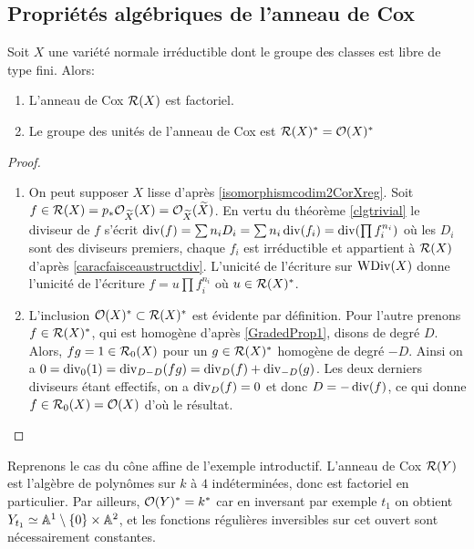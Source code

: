 \subsection{Propriétés algébriques de l'anneau de Cox}

\begin{thm}\label{coxFreeFactoriel}
Soit $X$ une variété normale irréductible dont le groupe des classes est libre de type fini. Alors:
\begin{enumerate}
\item L'anneau de Cox $\mathcal{R}(X)$ est factoriel.
\item Le groupe des unités de l'anneau de Cox est $\mathcal{R}(X)^*=\mathcal{O}(X)^*$
\end{enumerate}
\end{thm}
\begin{proof}
\begin{enumerate}
\item On peut supposer $X$ lisse d'après \ref{isomorphismcodim2CorXreg}. Soit $f\in \mathcal{R}(X)=p_*\mathcal{O}_{\widetilde{X}}(X)=\mathcal{O}_{\widetilde{X}}(\widetilde{X})$. En vertu du théorème \ref{clgtrivial} le diviseur de $f$ s'écrit $\operatorname{div}(f)= \sum n_iD_i=\sum n_i\operatorname{div}(f_i)=\operatorname{div}(\prod f_i^{n_i})$ où les $D_i$ sont des diviseurs premiers, chaque $f_i$ est irréductible et appartient à $\mathcal{R}(X)$ d'après \ref{caracfaisceaustructdiv}. L'unicité de l'écriture sur $\operatorname{WDiv}(X)$ donne l'unicité de l'écriture $f=u\prod f_i^{n_i}$ où $u\in \mathcal{R}(X)^*$.
\item L'inclusion $\mathcal{O}(X)^*\subset\mathcal{R}(X)^*$ est évidente par définition. Pour l'autre prenons $f\in\mathcal{R}(X)^*$, qui est homogène d'après \ref{GradedProp1}, disons de degré $D$. Alors, $fg=1\in \mathcal{R}_0(X)$ pour un $g\in\mathcal{R}(X)^*$ homogène de degré $-D$. Ainsi on a $0=\operatorname{div}_0(1)=\operatorname{div}_{D-D}(fg)=\operatorname{div}_D(f)+\operatorname{div}_{-D}(g)$. Les deux derniers diviseurs étant effectifs, on a $\operatorname{div}_D(f)=0$ et donc $D=-\operatorname{div}(f)$, ce qui donne $f\in\mathcal{R}_0(X)=\mathcal{O}(X)$ d'où le résultat.
\end{enumerate}
\end{proof}

\begin{ex}
Reprenons le cas du cône affine de l'exemple introductif.  L'anneau de Cox $\mathcal{R}(Y)$ est l'algèbre de polynômes sur $k$ à $4$ indéterminées, donc est factoriel en particulier.  Par ailleurs, $\mathcal{O}(Y)^*=k^*$ car en inversant par exemple $t_1$  on obtient $Y_{t_1}\simeq \mathbb{A}^{1}\setminus \lbrace0\rbrace\times\mathbb{A}^{2}$, et les fonctions régulières inversibles sur cet ouvert sont nécessairement constantes.
\end{ex}

